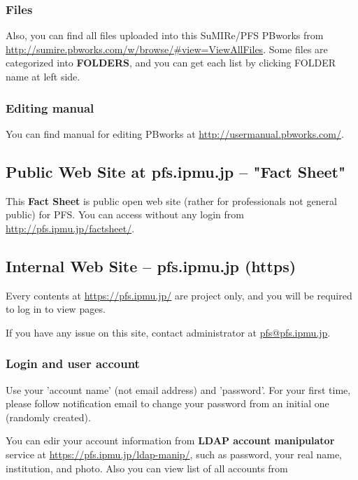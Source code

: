 \documentclass[a4paper,notitlepage]{article}
\begin{document}
\subsubsection{Files}

Also, you can find all files uploaded into this SuMIRe/PFS PBworks from 
\url{http://sumire.pbworks.com/w/browse/#view=ViewAllFiles}.
Some files are categorized into {\bf FOLDERS}, and you can get each list by 
clicking FOLDER name at left side. 

\subsubsection{Editing manual}

You can find manual for editing PBworks at 
\url{http://usermanual.pbworks.com/}. 


\subsection{Public Web Site at pfs.ipmu.jp -- "Fact Sheet"}

This {\bf Fact Sheet} is public open web site (rather for professionals 
not general public) for PFS. 
You can access without any login from \url{http://pfs.ipmu.jp/factsheet/}.

\subsection{Internal Web Site -- pfs.ipmu.jp (https)}

Every contents at \url{https://pfs.ipmu.jp/} are project only, and you will 
be required to log in to view pages. 

If you have any issue on this site, contact administrator 
at \url{pfs@pfs.ipmu.jp}. 

\subsubsection{Login and user account}

Use your 'account name' (not email address) and 'password'.
For your first time, please follow notification email to change your password 
from an initial one (randomly created). 

You can edir your account information from {\bf LDAP account manipulator} 
service at \url{https://pfs.ipmu.jp/ldap-manip/}, 
such as password, your real name, institution, and photo. 
Also you can view list of all accounts from 
\end{document}
